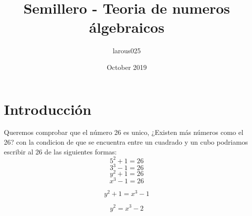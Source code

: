 \documentclass{article}
\title{Semillero - Teoria de numeros álgebraicos}
\author{larous025 }
\date{October 2019}
\begin{document}
\maketitle

\section{Introducción}
Queremos comprobar que el número 26 es unico, 
¿Existen más números como el 26? con la condicion de que se encuentra entre un cuadrado y un cubo
podriamos escribir al 26 de las siguientes formas:
\begin{equation*}
    5^2+1 = 26
\end{equation*}
\begin{equation*}
    3^3-1 = 26
\end{equation*}
\begin{equation*}
    y^2+1 = 26
\end{equation*}
\begin{equation*}
    x^3-1=26            
\end{equation*}

\begin{equation*}
    y^2+1 = x^3-1         
\end{equation*}

\begin{equation*}
    y^2 = x^3-2         
\end{equation*}
\end{document}
